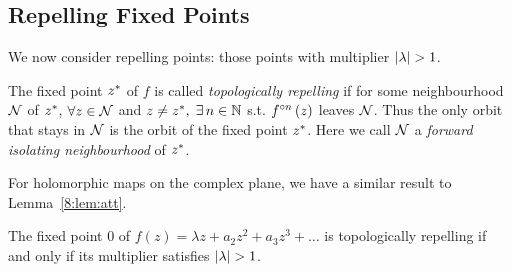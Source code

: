 \documentclass[../main.tex]{subfiles}
\begin{document}
\subsection{Repelling Fixed Points}
We now consider repelling points: those points with multiplier $\abs{\lambda}>1$. 

\begin{dfn}
    \label{8:dfn:rep}
    The fixed point $z^*$ of $f$ is called \emph{topologically repelling} if for some neighbourhood $\mathcal{N}$ of $z^*$, $\forall z \in \mathcal{N} $ and $z \neq z^*,\; \exists\, n \in \mathbb{N}$ s.t. $f^{\circ n}\left(z\right)$ leaves $\mathcal{N}$. Thus the only orbit that stays in $\mathcal{N}$ is the orbit of the fixed point $z^*$. Here we call $\mathcal{N}$ a \emph{forward isolating neighbourhood} of $z^*$.
\end{dfn}

For holomorphic maps on the complex plane, we have a similar result to Lemma~\ref{8:lem:att}.

\begin{lem}
    \label{8:lem:rep}
    The fixed point $0$ of $ f(z)=\lambda z+a_{2} z^{2}+a_{3} z^{3}+\dots$ is topologically repelling if and only if its multiplier satisfies $\abs{\lambda}>1$.
\end{lem}
\end{document}
